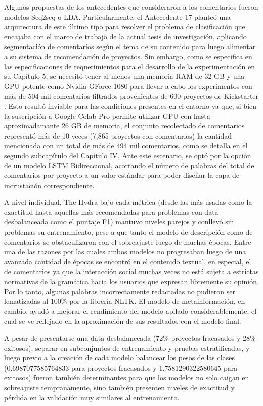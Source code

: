 Algunos propuestas de los antecedentes que consideraron a los comentarios fueron modelos Seq2seq o LDA. Particularmente, el Antecedente 17 planteó una arquitectura de este último tipo para resolver el problema de clasificación que encajaba con el marco de trabajo de la actual tesis de investigación, aplicando segmentación de comentarios según el tema de su contenido para luego alimentar a su sistema de recomendación de proyectos. Sin embargo, como se especifica en las especificaciones de requerimientos para el desarrollo de la experimentación en su Capítulo 5, se necesitó tener al menos una memoria RAM de 32 GB y una GPU potente como Nvidia GForce 1080 para llevar a cabo los experimentos con más de 504 mil comentarios filtrados provenientes de 600 proyectos de Kickstarter \parencite{pr_shafqat2019topicpredictions}. Esto resultó inviable para las condiciones presentes en el entorno ya que, si bien la suscripción a Google Colab Pro permite utilizar GPU con hasta aproximadamante 26 GB de memoria, el conjunto recolectado de comentarios representó más de 10 veces (7,865 proyectos con comentarios) la cantidad mencionada con un total de más de 494 mil comentarios, como se detalla en el segundo subcapítulo del Capítulo IV. Ante este escenario, se optó por la opción de un modelo LSTM Bidireccional, acortando el número de palabras del total de comentarios por proyecto a un valor estándar para poder diseñar la capa de incrustación correspondiente.

A nivel individual, The Hydra bajo cada métrica (desde las más usadas como la exactitud hasta aquellas más recomendadas para problemas con data desbalanceada como el puntaje F1) mantuvo niveles parejos y conllevó sin problemas su entrenamiento, pese a que tanto el modelo de descripción como de comentarios se obstaculizaron con el sobreajuste luego de muchas épocas. Entre una de las razones por las cuales ambos modelos no progresaban luego de una avanzada cantidad de épocas se encontró en el contenido textual, en especial, el de comentarios ya que la interacción social muchas veces no está sujeta a estrictas normativas de la gramática hacia los usuarios que expresan libremente su opinión. Por lo tanto, algunas palabras incorrectamente redactadas no pudieron ser lematizadas al 100\% por la librería NLTK. El modelo de metainformación, en cambio, ayudó a mejorar el rendimiento del modelo apilado considerablemente, el cual se ve reflejado en la aproximación de sus resultados con el modelo final.

A pesar de presentarse una data desbalanceada (72\% proyectos fracasados y 28\% exitosos), separar en subconjuntos de entrenamiento y pruebas estratificadas, y luego previo a la creación de cada modelo balancear los pesos de las clases (0.6987077585764833 para proyectos fracasados y 1.7581290322580645 para exitosos) fueron también determinantes para que los modelos no solo caigan en sobreajuste tempranamente, sino también presenten niveles de exactitud y pérdida en la validación muy similares al entrenamiento.

